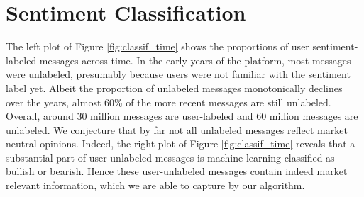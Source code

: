 



\section{Sentiment Classification}\label{S:classification}

The left plot of Figure \ref{fig:classif_time} shows the proportions of user sentiment-labeled messages across time. In the early years of the platform, most messages were unlabeled, presumably because users were not familiar with the sentiment label yet. Albeit the proportion of unlabeled messages monotonically declines over the years, almost 60\% of the more recent messages are still unlabeled. Overall, around 30 million messages are user-labeled and 60 million messages are unlabeled. We conjecture that by far not all unlabeled messages reflect market neutral opinions. Indeed, the right plot of Figure \ref{fig:classif_time} reveals that a substantial part of user-unlabeled messages is machine learning classified as bullish or bearish. Hence these user-unlabeled messages contain indeed market relevant information, which we are able to capture by our algorithm. 


